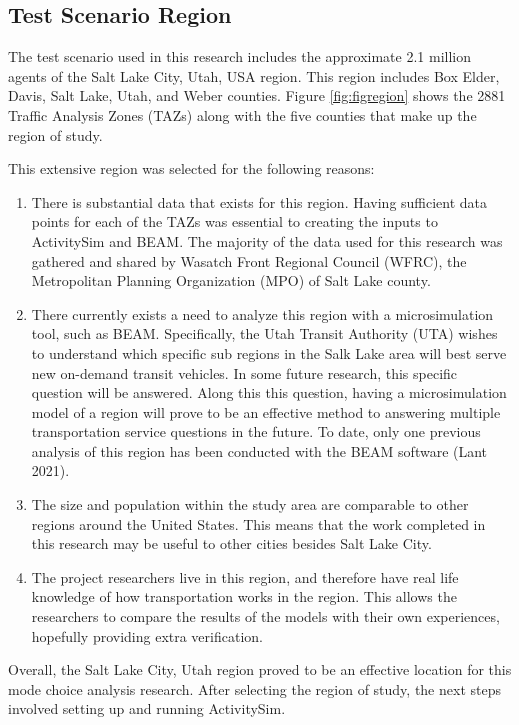 \documentclass[12pt, oneside, openright]{byuthesis}
\providecommand{\tightlist}{%
  \setlength{\itemsep}{0pt}\setlength{\parskip}{0pt}}
\begin{document}
\hypertarget{test-scenario-region}{%
\subsection{Test Scenario Region}\label{test-scenario-region}}

The test scenario used in this research includes the approximate 2.1 million agents of the Salt Lake City, Utah, USA region. This region includes Box Elder, Davis, Salt Lake, Utah, and Weber counties. Figure \ref{fig:figregion} shows the 2881 Traffic Analysis Zones (TAZs) along with the five counties that make up the region of study.

This extensive region was selected for the following reasons:

\begin{enumerate}
\def\labelenumi{\arabic{enumi}.}
\tightlist
\item
  There is substantial data that exists for this region. Having sufficient data points for each of the TAZs was essential to creating the inputs to ActivitySim and BEAM. The majority of the data used for this research was gathered and shared by Wasatch Front Regional Council (WFRC), the Metropolitan Planning Organization (MPO) of Salt Lake county.
\item
  There currently exists a need to analyze this region with a microsimulation tool, such as BEAM. Specifically, the Utah Transit Authority (UTA) wishes to understand which specific sub regions in the Salk Lake area will best serve new on-demand transit vehicles. In some future research, this specific question will be answered. Along this this question, having a microsimulation model of a region will prove to be an effective method to answering multiple transportation service questions in the future. To date, only one previous analysis of this region has been conducted with the BEAM software (Lant 2021).
\item
  The size and population within the study area are comparable to other regions around the United States. This means that the work completed in this research may be useful to other cities besides Salt Lake City.
\item
  The project researchers live in this region, and therefore have real life knowledge of how transportation works in the region. This allows the researchers to compare the results of the models with their own experiences, hopefully providing extra verification.
\end{enumerate}

Overall, the Salt Lake City, Utah region proved to be an effective location for this mode choice analysis research. After selecting the region of study, the next steps involved setting up and running ActivitySim.
\end{document}
